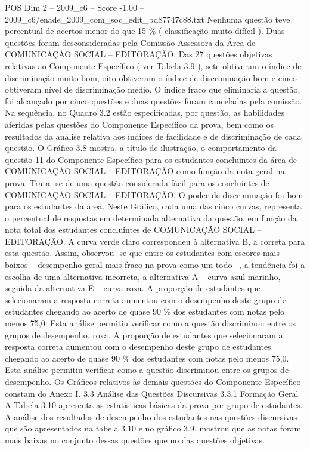 \begin{textsample}{POS Dim 2 – 2009\_c6 – Score -1.00 – 2009\_c6/enade\_2009\_com\_soc\_edit\_bd87747c88.txt}
Nenhuma questão teve percentual de acertos menor do que 15 \% ( classificação muito difícil ).
Duas questões foram desconsideradas pela Comissão Assessora da Área de COMUNICAÇÃO SOCIAL – EDITORAÇÃO.
Das 27 questões objetivas relativas ao Componente Específico ( ver Tabela 3.9 ), sete obtiveram o índice de discriminação muito bom, oito obtiveram o índice de discriminação bom e cinco obtiveram nível de discriminação médio.
O índice fraco que eliminaria a questão, foi alcançado por cinco questões e duas questões foram canceladas pela comissão.
Na sequência, no Quadro 3.2 estão especificadas, por questão, as habilidades aferidas pelas questões do Componente Específico da prova, bem como os resultados da análise relativa aos índices de facilidade e de discriminação de cada questão.
O Gráfico 3.8 mostra, a título de ilustração, o comportamento da questão 11 do Componente Específico para os estudantes concluintes da área de COMUNICAÇÃO SOCIAL – EDITORAÇÃO como função da nota geral na prova.
Trata -se de uma questão considerada fácil para os concluintes de COMUNICAÇÃO SOCIAL – EDITORAÇÃO.
O poder de discriminação foi bom para os estudantes da área.
Neste Gráfico, cada uma das cinco curvas, representa o percentual de respostas em determinada alternativa da questão, em função da nota total dos estudantes concluintes de COMUNICAÇÃO SOCIAL – EDITORAÇÃO.
A curva verde claro correspondeu à alternativa B, a correta para esta questão.
Assim, observou -se que entre os estudantes com escores mais baixos – desempenho geral mais fraco na prova como um todo –, a tendência foi a escolha de uma alternativa incorreta, a alternativa A – curva azul marinho, seguida da alternativa E – curva roxa.
A proporção de estudantes que selecionaram a resposta correta aumentou com o desempenho deste grupo de estudantes chegando ao acerto de quase 90 \% dos estudantes com notas pelo menos 75,0.
Esta análise permitiu verificar como a questão discriminou entre os grupos de desempenho. roxa.
A proporção de estudantes que selecionaram a resposta correta aumentou com o desempenho deste grupo de estudantes chegando ao acerto de quase 90 \% dos estudantes com notas pelo menos 75,0.
Esta análise permitiu verificar como a questão discriminou entre os grupos de desempenho.
Os Gráficos relativos às demais questões do Componente Específico constam do Anexo I. 3.3 Análise das Questões Discursivas 3.3.1 Formação Geral A Tabela 3.10 apresenta as estatísticas básicas da prova por grupo de estudantes.
A análise dos resultados de desempenho dos estudantes nas questões discursivas que são apresentados na tabela 3.10 e no gráfico 3.9, mostrou que as notas foram mais baixas no conjunto dessas questões que no das questões objetivas.

\end{textsample}
